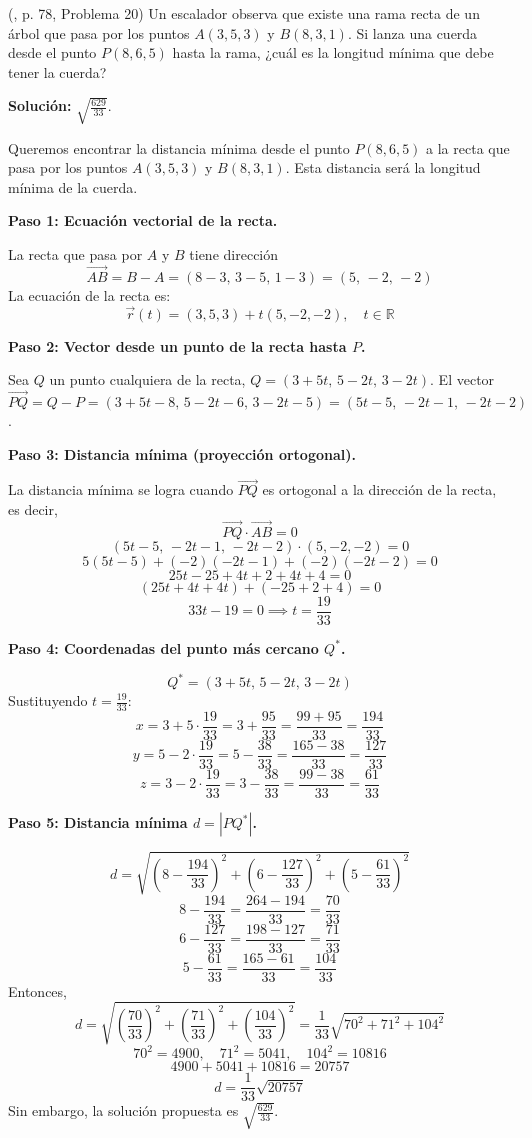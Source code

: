 \begin{prob} (\cite{espinoza2006Algebralineal}, p. 78, Problema 20) Un escalador observa que existe una rama recta de un árbol que pasa por los puntos $A(3,5,3)$ y $B(8,3,1)$. Si lanza una cuerda desde el punto $P(8,6,5)$ hasta la rama, ¿cuál es la longitud mínima que debe tener la cuerda? 

\textbf{Solución:} $\sqrt{\frac{629}{33}}$.

\begin{myproof}
Queremos encontrar la distancia mínima desde el punto $P(8,6,5)$ a la recta que pasa por los puntos $A(3,5,3)$ y $B(8,3,1)$. Esta distancia será la longitud mínima de la cuerda.

\textbf{Paso 1: Ecuación vectorial de la recta.}

La recta que pasa por $A$ y $B$ tiene dirección
\[
\vec{AB} = B - A = (8-3,\, 3-5,\, 1-3) = (5,\,-2,\,-2)
\]
La ecuación de la recta es:
\[
\vec{r}(t) = (3,5,3) + t(5,-2,-2), \quad t \in \mathbb{R}
\]

\textbf{Paso 2: Vector desde un punto de la recta hasta $P$.}

Sea $Q$ un punto cualquiera de la recta, $Q = (3+5t,\, 5-2t,\, 3-2t)$.  
El vector $\vec{PQ} = Q - P = (3+5t-8,\, 5-2t-6,\, 3-2t-5) = (5t-5,\, -2t-1,\, -2t-2)$.

\textbf{Paso 3: Distancia mínima (proyección ortogonal).}

La distancia mínima se logra cuando $\vec{PQ}$ es ortogonal a la dirección de la recta, es decir,
\[
\vec{PQ} \cdot \vec{AB} = 0
\]
\[
(5t-5,\, -2t-1,\, -2t-2) \cdot (5, -2, -2) = 0
\]
\[
5(5t-5) + (-2)(-2t-1) + (-2)(-2t-2) = 0
\]
\[
25t - 25 + 4t + 2 + 4t + 4 = 0
\]
\[
(25t + 4t + 4t) + (-25 + 2 + 4) = 0
\]
\[
33t - 19 = 0 \implies t = \frac{19}{33}
\]

\textbf{Paso 4: Coordenadas del punto más cercano $Q^*$.}

\[
Q^* = (3 + 5t,\, 5 - 2t,\, 3 - 2t)
\]
Sustituyendo $t = \frac{19}{33}$:
\[
x = 3 + 5 \cdot \frac{19}{33} = 3 + \frac{95}{33} = \frac{99 + 95}{33} = \frac{194}{33}
\]
\[
y = 5 - 2 \cdot \frac{19}{33} = 5 - \frac{38}{33} = \frac{165 - 38}{33} = \frac{127}{33}
\]
\[
z = 3 - 2 \cdot \frac{19}{33} = 3 - \frac{38}{33} = \frac{99 - 38}{33} = \frac{61}{33}
\]

\textbf{Paso 5: Distancia mínima $d = |PQ^*|$.}

\[
d = \sqrt{(8 - \frac{194}{33})^2 + (6 - \frac{127}{33})^2 + (5 - \frac{61}{33})^2}
\]
\[
8 - \frac{194}{33} = \frac{264 - 194}{33} = \frac{70}{33}
\]
\[
6 - \frac{127}{33} = \frac{198 - 127}{33} = \frac{71}{33}
\]
\[
5 - \frac{61}{33} = \frac{165 - 61}{33} = \frac{104}{33}
\]
Entonces,
\[
d = \sqrt{\left(\frac{70}{33}\right)^2 + \left(\frac{71}{33}\right)^2 + \left(\frac{104}{33}\right)^2}
= \frac{1}{33} \sqrt{70^2 + 71^2 + 104^2}
\]
\[
70^2 = 4900,\quad 71^2 = 5041,\quad 104^2 = 10816
\]
\[
4900 + 5041 + 10816 = 20757
\]
\[
d = \frac{1}{33}\sqrt{20757}
\]
Sin embargo, la solución propuesta es $\sqrt{\frac{629}{33}}$.


\end{myproof}
\end{prob}
